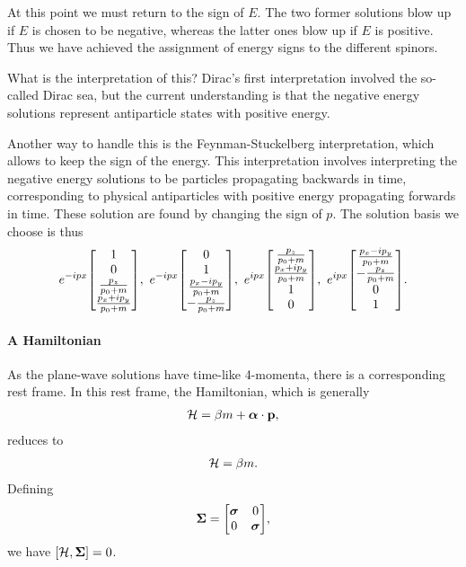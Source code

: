At this point we must return to the sign of $E$. The two former solutions blow up if $E$ is chosen to be negative, whereas the latter ones blow up if $E$ is positive. Thus we have achieved the assignment of energy signs to the different spinors.

What is the interpretation of this? Dirac's first interpretation involved the so-called Dirac sea, but the current understanding is that the negative energy solutions represent antiparticle states with positive energy.

Another way to handle this is the Feynman-Stuckelberg interpretation, which allows to keep the sign of the energy. This interpretation involves interpreting the negative energy solutions to be particles propagating backwards in time, corresponding to physical antiparticles with positive energy propagating forwards in time. These solution are found by changing the sign of $p$. The solution basis we choose is thus
\begin{align*}
	e^{-ipx}\mqty[
		1 \\
		0 \\
		\frac{p_{z}}{p_{0} + m} \\
		\frac{p_{x} + ip_{y}}{p_{0} + m}
	],\ e^{-ipx}\mqty[
		0 \\
		1 \\
		\frac{p_{x} - ip_{y}}{p_{0} + m} \\
		-\frac{p_{z}}{p_{0} + m}
	],\ e^{ipx}\mqty[
		\frac{p_{z}}{p_{0} + m} \\
		\frac{p_{x} + ip_{y}}{p_{0} + m} \\
		1 \\
		0
	],\ e^{ipx}\mqty[
		\frac{p_{x} - ip_{y}}{p_{0} + m} \\
		-\frac{p_{z}}{p_{0} + m} \\
		0 \\
		1
	].
\end{align*}

\paragraph{A Hamiltonian}
As the plane-wave solutions have time-like 4-momenta, there is a corresponding rest frame. In this rest frame, the Hamiltonian, which is generally
\begin{align*}
	\mathcal{H} = \beta m + \vb*{\alpha}\cdot\vb{p},
\end{align*}
reduces to
\begin{align*}
	\mathcal{H} = \beta m.
\end{align*}
Defining
\begin{align*}
	\vb*{\Sigma} =
	\mqty[
		\vb*{\sigma} & 0 \\
		0            & \vb*{\sigma}
	],
\end{align*}
we have $\comm{\ham}{\vb*{\Sigma}} = 0$.

